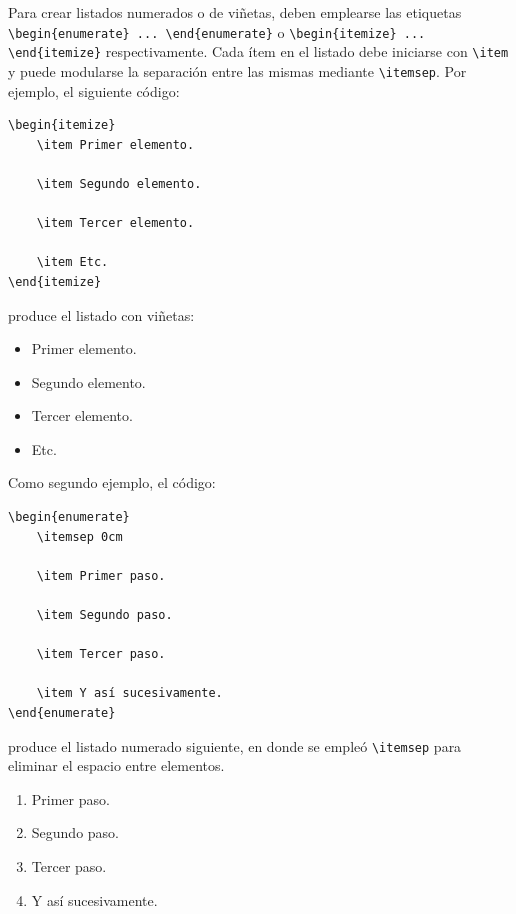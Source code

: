 Para crear listados numerados o de viñetas, deben emplearse las etiquetas \newline \verb|\begin{enumerate} ... \end{enumerate}| o \verb|\begin{itemize} ... \end{itemize}| respectivamente. Cada ítem en el listado debe iniciarse con \verb|\item| y puede modularse la separación entre las mismas mediante \verb|\itemsep|. Por ejemplo, el siguiente código:
\begin{verbatim}
\begin{itemize}
    \item Primer elemento.

    \item Segundo elemento.

    \item Tercer elemento.

    \item Etc.
\end{itemize}
\end{verbatim}

produce el listado con viñetas:
\begin{itemize}
    \item Primer elemento.

    \item Segundo elemento.

    \item Tercer elemento.

    \item Etc.
\end{itemize}

Como segundo ejemplo, el código:
\begin{verbatim}
\begin{enumerate}
    \itemsep 0cm 
    
    \item Primer paso.

    \item Segundo paso.

    \item Tercer paso.

    \item Y así sucesivamente.
\end{enumerate}
\end{verbatim}

produce el listado numerado siguiente, en donde se empleó \verb|\itemsep| para eliminar el espacio entre elementos.
\begin{enumerate}
    \itemsep 0cm 
    
    \item Primer paso.

    \item Segundo paso.

    \item Tercer paso.

    \item Y así sucesivamente.
\end{enumerate}

